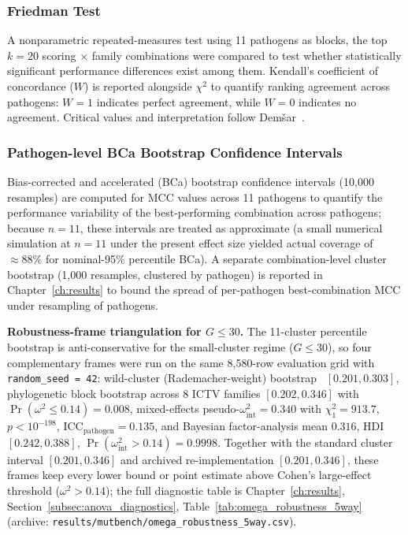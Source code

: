 \subsubsection{Friedman Test}

A nonparametric repeated-measures test using 11 pathogens as blocks, the top $k = 20$ scoring $\times$ family combinations were compared to test whether statistically significant performance differences exist among them.
Kendall's coefficient of concordance ($W$) is reported alongside $\chi^2$ to quantify ranking agreement across pathogens: $W = 1$ indicates perfect agreement, while $W = 0$ indicates no agreement.
Critical values and interpretation follow Dem\v{s}ar~\cite{demsar2006statistical}.

\subsubsection{Pathogen-level BCa Bootstrap Confidence Intervals}
\label{subsec:wild_cluster_future}

Bias-corrected and accelerated (BCa) bootstrap confidence intervals (10,000 resamples) are computed for MCC values across 11 pathogens to quantify the performance variability of the best-performing combination across pathogens; because $n = 11$, these intervals are treated as approximate (a small numerical simulation at $n = 11$ under the present effect size yielded actual coverage of $\approx 88\%$ for nominal-95\% percentile BCa).
A separate combination-level cluster bootstrap (1{,}000 resamples, clustered by pathogen) is reported in Chapter~\ref{ch:results} to bound the spread of per-pathogen best-combination MCC under resampling of pathogens.

\textbf{Robustness-frame triangulation for $G \leq 30$.} The 11-cluster percentile bootstrap is anti-conservative for the small-cluster regime ($G \leq 30$), so four complementary frames were run on the same 8{,}580-row evaluation grid with \texttt{random\_seed = 42}: wild-cluster (Rademacher-weight) bootstrap~\cite{cameron2008bootstrap} $[0.201, 0.303]$, phylogenetic block bootstrap across 8 ICTV families $[0.202, 0.346]$ with $\Pr(\omega^2 \leq 0.14) = 0.008$, mixed-effects pseudo-$\omega^2_{\text{int}} = 0.340$ with $\chi^2_1 = 913.7$, $p < 10^{-198}$, $\mathrm{ICC}_{\text{pathogen}} = 0.135$, and Bayesian factor-analysis mean $0.316$, HDI $[0.242, 0.388]$, $\Pr(\omega^2_{\text{int}} > 0.14) = 0.9998$.
Together with the standard cluster interval $[0.201, 0.346]$ and archived re-implementation $[0.201, 0.346]$, these frames keep every lower bound or point estimate above Cohen's large-effect threshold ($\omega^2 > 0.14$); the full diagnostic table is Chapter~\ref{ch:results}, Section~\ref{subsec:anova_diagnostics}, Table~\ref{tab:omega_robustness_5way} (archive: \texttt{results/mutbench/omega\_robustness\_5way.csv}).

